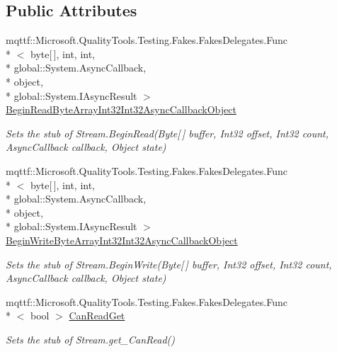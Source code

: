 \subsection*{Public Attributes}
\begin{DoxyCompactItemize}
\item 
mqttf\-::\-Microsoft.\-Quality\-Tools.\-Testing.\-Fakes.\-Fakes\-Delegates.\-Func\\*
$<$ byte\mbox{[}$\,$\mbox{]}, int, int, \\*
global\-::\-System.\-Async\-Callback, \\*
object, \\*
global\-::\-System.\-I\-Async\-Result $>$ \hyperlink{class_system_1_1_net_1_1_security_1_1_fakes_1_1_stub_authenticated_stream_afb64fd093777b99dabf328f65a0f9fda}{Begin\-Read\-Byte\-Array\-Int32\-Int32\-Async\-Callback\-Object}
\begin{DoxyCompactList}\small\item\em Sets the stub of Stream.\-Begin\-Read(\-Byte\mbox{[}$\,$\mbox{]} buffer, Int32 offset, Int32 count, Async\-Callback callback, Object state)\end{DoxyCompactList}\item 
mqttf\-::\-Microsoft.\-Quality\-Tools.\-Testing.\-Fakes.\-Fakes\-Delegates.\-Func\\*
$<$ byte\mbox{[}$\,$\mbox{]}, int, int, \\*
global\-::\-System.\-Async\-Callback, \\*
object, \\*
global\-::\-System.\-I\-Async\-Result $>$ \hyperlink{class_system_1_1_net_1_1_security_1_1_fakes_1_1_stub_authenticated_stream_a8da713aa6f4bf4c6c68ff85aa808db3e}{Begin\-Write\-Byte\-Array\-Int32\-Int32\-Async\-Callback\-Object}
\begin{DoxyCompactList}\small\item\em Sets the stub of Stream.\-Begin\-Write(\-Byte\mbox{[}$\,$\mbox{]} buffer, Int32 offset, Int32 count, Async\-Callback callback, Object state)\end{DoxyCompactList}\item 
mqttf\-::\-Microsoft.\-Quality\-Tools.\-Testing.\-Fakes.\-Fakes\-Delegates.\-Func\\*
$<$ bool $>$ \hyperlink{class_system_1_1_net_1_1_security_1_1_fakes_1_1_stub_authenticated_stream_a395c8a154cfb59f34d33692baadc012b}{Can\-Read\-Get}
\begin{DoxyCompactList}\small\item\em Sets the stub of Stream.\-get\-\_\-\-Can\-Read()\end{DoxyCompactList}\item 

\end{DoxyCompactItemize}
